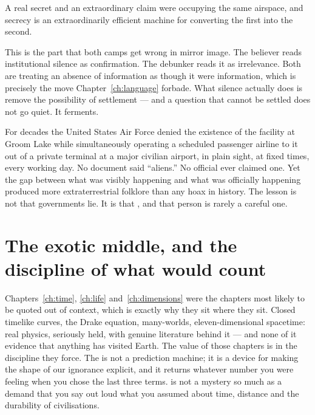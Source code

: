A real secret and an extraordinary claim were occupying the same
airspace, and secrecy is an extraordinarily efficient machine for converting the
first into the second.

This is the part that both camps get wrong in mirror image. The believer reads
institutional silence as confirmation. The debunker reads it as irrelevance.
Both are treating an absence of information as though it were information, which
is precisely the move Chapter~\ref{ch:language} forbade. What silence actually
does is remove the possibility of settlement --- and a question that cannot be
settled does not go quiet. It ferments.

\begin{funfact}
For decades the United States Air Force denied the existence of the facility at
Groom Lake while simultaneously operating a scheduled passenger airline to it out
of a private terminal at a major civilian airport, in plain sight, at fixed
times, every working day. No document said ``aliens.'' No official ever claimed
one. Yet the gap between what was visibly happening and what was officially
happening produced more extraterrestrial folklore than any hoax in history. The
lesson is not that governments lie. It is that , and that person is rarely a careful
one.
\end{funfact}

\section*{The exotic middle, and the discipline of what would count}

Chapters~\ref{ch:time}, \ref{ch:life} and~\ref{ch:dimensions} were the chapters
most likely to be quoted out of context, which is exactly why they sit where they
sit. Closed timelike curves, the Drake equation, many-worlds, eleven-dimensional
spacetime: real physics, seriously held, with genuine literature behind it --- and
none of it evidence that anything has visited Earth. The value of those chapters
is in the discipline they force. The  is not a prediction
machine; it is a device for making the shape of our ignorance explicit, and it
returns whatever number you were feeling when you chose the last three terms.
 is not a mystery so much as a demand that you say out loud
what you assumed about time, distance and the durability of civilisations.

